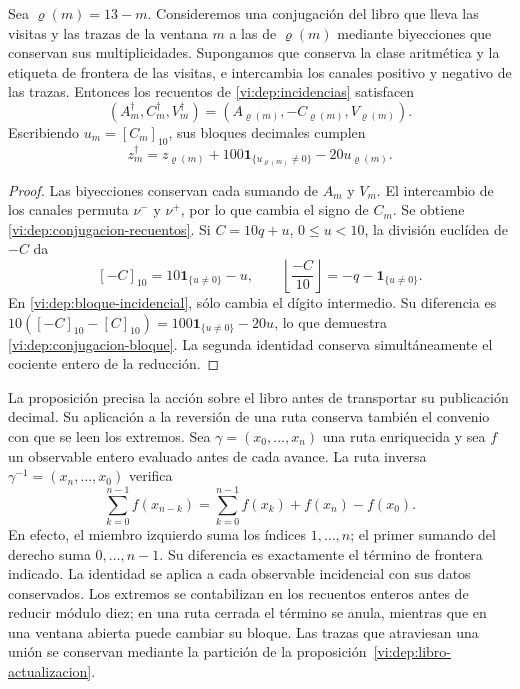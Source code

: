 \begin{proposition}
\label{vi:dep:conjugacion-incidencial}
Sea \(\varrho(m)=13-m\). Consideremos una conjugación del libro
que lleva las visitas y las trazas de la ventana \(m\) a las de
\(\varrho(m)\) mediante biyecciones que conservan sus multiplicidades.
Supongamos que conserva la clase aritmética y la etiqueta de frontera
de las visitas, e intercambia los canales positivo y negativo de las
trazas. Entonces los recuentos de \eqref{vi:dep:incidencias} satisfacen
\begin{equation}
 (A_m^\dagger,C_m^\dagger,V_m^\dagger)
 =(A_{\varrho(m)},-C_{\varrho(m)},V_{\varrho(m)}).
 \label{vi:dep:conjugacion-recuentos}
\end{equation}
Escribiendo \(u_m=[C_m]_{10}\), sus bloques decimales cumplen
\begin{equation}
 z_m^\dagger=z_{\varrho(m)}
       +100\mathbf1_{\{u_{\varrho(m)}\ne0\}}-20u_{\varrho(m)}.
 \label{vi:dep:conjugacion-bloque}
\end{equation}
\end{proposition}
\begin{proof}
Las biyecciones conservan cada sumando de \(A_m\) y \(V_m\).
El intercambio de los canales permuta \(\nu^-\) y \(\nu^+\),
por lo que cambia el signo de \(C_m\). Se obtiene
\eqref{vi:dep:conjugacion-recuentos}. Si \(C=10q+u\),
\(0\le u<10\), la división euclídea de \(-C\) da
\[
 [-C]_{10}=10\mathbf1_{\{u\ne0\}}-u,
 \qquad
 \left\lfloor\frac{-C}{10}\right\rfloor
 =-q-\mathbf1_{\{u\ne0\}}.
\]
En \eqref{vi:dep:bloque-incidencial}, sólo cambia el dígito
intermedio. Su diferencia es
\(10([-C]_{10}-[C]_{10})=100\mathbf1_{\{u\ne0\}}-20u\),
lo que demuestra \eqref{vi:dep:conjugacion-bloque}. La segunda
identidad conserva simultáneamente el cociente entero de la reducción.
\end{proof}

La proposición precisa la acción sobre el libro antes de transportar
su publicación decimal. Su aplicación a la reversión de una ruta
conserva también el convenio con que se leen los extremos. Sea
\(\gamma=(x_0,\ldots,x_n)\) una ruta enriquecida y sea \(f\) un
observable entero evaluado antes de cada avance. La ruta inversa
\(\gamma^{-1}=(x_n,\ldots,x_0)\) verifica
\begin{equation}
 \sum_{k=0}^{n-1}f(x_{n-k})
 =\sum_{k=0}^{n-1}f(x_k)+f(x_n)-f(x_0).
 \label{vi:dep:conjugacion-frontera}
\end{equation}
En efecto, el miembro izquierdo suma los índices \(1,\ldots,n\);
el primer sumando del derecho suma \(0,\ldots,n-1\). Su diferencia
es exactamente el término de frontera indicado. La identidad se aplica
a cada observable incidencial con sus datos conservados. Los extremos
se contabilizan en los recuentos enteros antes de reducir módulo diez;
en una ruta cerrada el término se anula, mientras que en una ventana
abierta puede cambiar su bloque. Las trazas que atraviesan una unión
se conservan mediante la partición de la
proposición~\ref{vi:dep:libro-actualizacion}.

